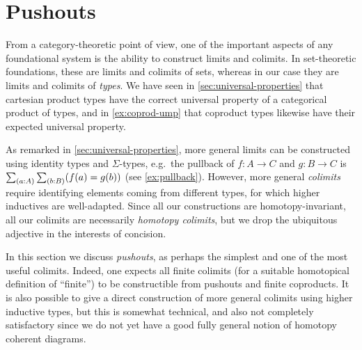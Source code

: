 %
%

%


\section{Pushouts}
\label{sec:colimits}

%
%
%
%
From a category-theoretic point of view, one of the important aspects of any foundational system is the ability to construct limits and colimits.
In set-theoretic foundations, these are limits and colimits of sets, whereas in our case they are limits and colimits of \emph{types}.
We have seen in \autoref{sec:universal-properties} that cartesian product types have the correct universal property of a categorical product of types, and in \autoref{ex:coprod-ump} that coproduct types likewise have their expected universal property.

As remarked in \autoref{sec:universal-properties}, more general limits can be constructed using identity types and $\Sigma$-types, e.g.\ the pullback of $f:A\to C$ and $g:B\to C$ is $\sm{a:A}{b:B} (f(a)=g(b))$ (see \autoref{ex:pullback}).
However, more general \emph{colimits} require identifying elements coming from different types, for which higher inductives are well-adapted.
Since all our constructions are homotopy-invariant, all our colimits are necessarily \emph{homotopy colimits}, but we drop the ubiquitous adjective in the interests of concision.

In this section we discuss \emph{pushouts}, as perhaps the simplest and one of the most useful colimits.
Indeed, one expects all finite colimits (for a suitable homotopical definition of ``finite'') to be constructible from pushouts and finite coproducts.
It is also possible to give a direct construction of more general colimits using higher inductive types, but this is somewhat technical, and also not completely satisfactory since we do not yet have a good fully general notion of homotopy coherent diagrams.


